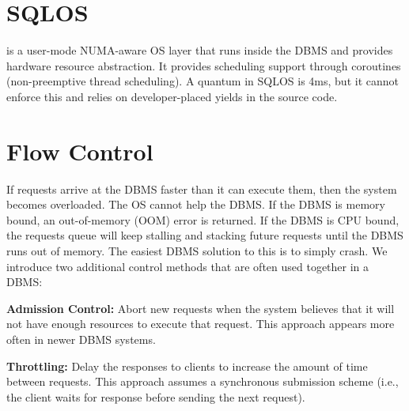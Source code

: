 \documentclass[11pt]{article}
\begin{document}
\section{SQLOS}
 is a user-mode NUMA-aware OS layer that runs inside the DBMS and provides hardware resource 
abstraction. It provides scheduling support through coroutines (non-preemptive thread scheduling). A quantum 
in SQLOS is 4ms, but it cannot enforce this and relies on developer-placed yields in the source code.

\section{Flow Control}
If requests arrive at the DBMS faster than it can execute them, then the system becomes 
overloaded. The OS cannot help the DBMS. If the DBMS is memory bound, an out-of-memory (OOM) error 
is returned. If the DBMS is CPU bound, the requests queue will keep stalling and stacking future 
requests until the DBMS runs out of memory. The easiest DBMS solution to this is to simply crash. We 
introduce two additional control methods that are often used together in a DBMS:

\textbf{Admission Control:}
Abort new requests when the system believes that it will not have enough resources to execute that 
request. This approach appears more often in newer DBMS systems.

\textbf{Throttling:}
Delay the responses to clients to increase the amount of time between requests. 
This approach assumes a synchronous submission scheme (i.e., the client waits for response before 
sending the next request).

\newpage


\end{document}
